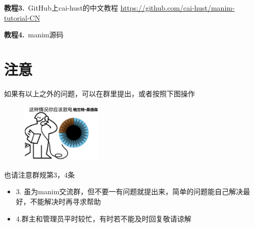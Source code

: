 \documentclass[UTF8]{ctexart}
\begin{document}
\textbf{教程3.}\ GitHub上cai-hust的中文教程
\url{https://github.com/cai-hust/manim-tutorial-CN}

\textbf{教程4.}\ manim源码

\section{注意}
如果有以上之外的问题，可以在群里提出，或者按照下图操作
\begin{figure}[h]
\centering
\includegraphics[width=0.35\textwidth]{Grant.png}
\end{figure}

也请注意群规第3，4条
\begin{itemize}
	\item 3. 虽为manim交流群，但不要一有问题就提出来，简单的问题能自己解决最好，不能解决时再寻求帮助
	\item 4.群主和管理员平时较忙，有时若不能及时回复敬请谅解
\end{itemize}
\end{document}
